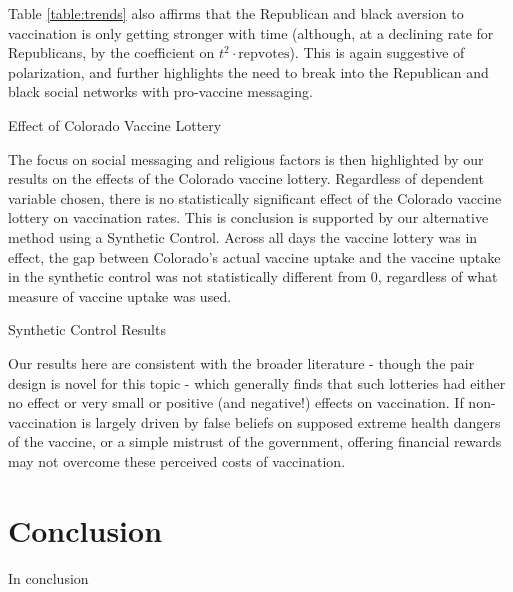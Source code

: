 \documentclass[12pt]{article}
\begin{document}
\begin{spacing}{1.5}
		Table \ref{table:trends} also affirms that the Republican and black aversion to vaccination is only getting stronger with time (although, at a declining rate for Republicans, by the coefficient on $t^2\cdot \textrm{repvotes}$). This is again suggestive of polarization, and further highlights the need to break into the Republican and black social networks with pro-vaccine messaging.
		
		\begin{table}
			\centering
			\caption{Effect of Colorado Vaccine Lottery}
			\centerline{}
			\label{table:didresults}
		\end{table}
		
		The focus on social messaging and religious factors is then highlighted by our results on the effects of the Colorado vaccine lottery. Regardless of dependent variable chosen, there is no statistically significant effect of the Colorado vaccine lottery on vaccination rates. This is conclusion is supported by our alternative method using a Synthetic Control. Across all days the vaccine lottery was in effect, the gap between Colorado's actual vaccine uptake and the vaccine uptake in the synthetic control was not statistically different from 0, regardless of what measure of vaccine uptake was used.
		
		\begin{table}
			\caption{Synthetic Control Results}
			
		\end{table}
		
		Our results here are consistent with the broader literature - though the pair design is novel for this topic - which generally finds that such lotteries had either no effect or very small or positive (and negative!) effects on vaccination. If non-vaccination is largely driven by false beliefs on supposed extreme health dangers of the vaccine, or a simple mistrust of the government, offering financial rewards may not overcome these perceived costs of vaccination.
		
		\section{Conclusion}
		In conclusion
		
	
		
	\end{spacing}
\end{document}
